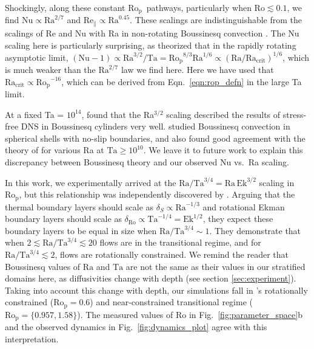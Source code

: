 \documentclass[twocolumn, amsmath, amsfonts, amssymb, trackchanges]{aastex62}
\newcommand{\pro}{\ensuremath{\text{Ro}_{\text{p}}}}
\begin{document}
Shockingly, along these constant \pro$\,$ pathways, particularly when $\text{Ro} \lesssim 0.1$, 
we find $\text{Nu} \propto \text{Ra}^{2/7}$ and $\text{Re}_\parallel \propto \text{Ra}^{0.45}$.
These scalings are indistinguishable from the scalings of
Re and Nu with Ra in non-rotating Boussinesq convection \citep{ahlers&all2009}. The Nu scaling here
is particularly surprising, as \citet{julien&all2012} theorized that in the rapidly rotating
asymptotic limit, $(\text{Nu} - 1) \propto \text{Ra}^{3/2}/\text{Ta} = \pro^{8/3}\text{Ra}^{1/6} \propto (\text{Ra}/\text{Ra}_{\text{crit}})^{1/6}$,
which is much weaker than the $\text{Ra}^{2/7}$ law we find here.
Here we have used that $\text{Ra}_{\text{crit}} \propto \pro^{-16}$, which can be derived from Eqn.~\ref{eqn:rop_defn} in the
large Ta limit.

At a fixed Ta = $10^{14}$, \citet{stellmach&all2014} found that the Ra$^{3/2}$ scaling described
the results of stress-free DNS in Boussinesq cylinders very well.  \citet{gastine&all2016} 
studied Boussinesq convection in spherical shells with no-slip boundaries, and also found 
good agreement with the theory of \citet{julien&all2012} for various Ra at $\text{Ta} \geq 10^{10}$. 
We leave it to future work to explain this discrepancy between
Boussinesq theory and our observed Nu vs.~Ra scaling.

In this work, we experimentally arrived at the 
$\text{Ra}/\text{Ta}^{3/4} = \text{Ra}\,\text{Ek}^{3/2}$
scaling in \pro, but this relationship was independently
discovered by \cite{king&all2012}. Arguing that the thermal boundary layers should
scale as $\delta_{S} \propto \text{Ra}^{-1/3}$ and rotational Ekman boundary layers
should scale as $\delta_{\text{Ro}} \propto \text{Ta}^{-1/4} = \text{Ek}^{1/2}$, they
expect these boundary layers to be equal in size when $\text{Ra}/\text{Ta}^{3/4} \sim 1$.
They demonstrate that when $2 \lesssim\text{Ra}/\text{Ta}^{3/4} \lesssim 20$ flows are in the
transitional regime, and for $\text{Ra}/\text{Ta}^{3/4} \lesssim 2$, flows are rotationally
constrained. We remind the reader that Boussinesq values of $\text{Ra}$ and $\text{Ta}$ are 
not the same as their
values in our stratified domains here, as diffusivities change with depth (see section \ref{sec:experiment}). 
Taking into account this change with depth,
our simulations fall in \cite{king&all2012}'s rotationally constrained
($\pro = 0.6$) and near-constrained transitional regime ($\pro = \{0.957, 1.58\}$).
The measured values of Ro in Fig.~\ref{fig:parameter_space}b and the observed dynamics
in Fig.~\ref{fig:dynamics_plot} agree with this interpretation.
\end{document}
